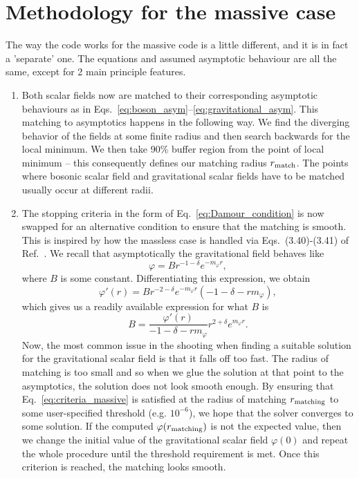 \documentclass[12pt]{article}
\numberwithin{equation}{section}
\begin{document}
\section{Methodology for the massive case} \label{sec:massive_methodology}
The way the code works for the massive code is a little different, and it is in fact a 'separate' one. The equations and assumed asymptotic behaviour are all the same, except for 2 main principle features.
\begin{enumerate}
    \item Both scalar fields now are matched to their corresponding asymptotic behaviours as in Eqs.~\eqref{eq:boson_asym}--\eqref{eq:gravitational_asym}. This matching to asymptotics happens in the following way. We find the diverging behavior of the fields at some finite radius and then search backwards for the local minimum. We then take 90\% buffer region from the point of local minimum -- this consequently defines our matching radius $r_{\rm match}$. The points where bosonic scalar field and gravitational scalar fields have to be matched usually occur at different radii.
    \item The stopping criteria in the form of Eq.~\eqref{eq:Damour_condition} is now swapped for an alternative condition to ensure that the matching is smooth. This is inspired by how the massless case is handled via Eqs.~(3.40)-(3.41) of Ref.~\cite{Comer:1997ns}. We recall that asymptotically the gravitational field behaves like
    \begin{equation} \label{eq:criteria_massive}
        \varphi = B r^{-1 - \delta} e^{-m_{\varphi} r},
    \end{equation}
    where $B$ is some constant. Differentiating this expression, we obtain 
    \begin{equation} \label{eq:Bconstant}
    \varphi'(r) = B r^{-2 - \delta} e^{-m_{\varphi}r} \left(-1 - \delta - r m_{\varphi} \right),
    \end{equation}
    which gives us a readily available expression for what $B$ is
    \begin{equation}
        B = \frac{\varphi'(r)}{-1-\delta-rm_{\varphi}}r^{2+\delta}e^{m_{\varphi}r}.
    \end{equation}
    Now, the most common issue in the shooting when finding a suitable solution for the gravitational scalar field is that it falls off too fast. The radius of matching is too small and so when we glue the solution at that point to the asymptotics, the solution does not look smooth enough. By ensuring that Eq.~\eqref{eq:criteria_massive} is satisfied at the radius of matching $r_{\rm{matching}}$ to some user-specified threshold (e.g. $10^{-6}$), we hope that the solver converges to some solution. If the computed $\varphi(r_{\rm{matching}})$ is not the expected value, then we change the initial value of the gravitational scalar field $\varphi(0)$ and repeat the whole procedure until the threshold requirement is met. Once this criterion is reached, the matching looks smooth.
\end{enumerate}
\end{document}
